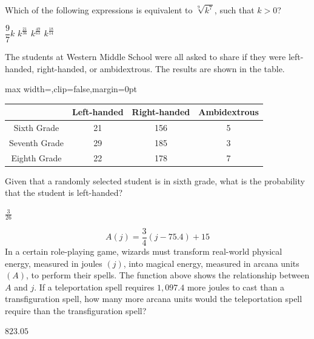 \newpage




\question[1]
Which of the following expressions is equivalent to $\sqrt[9]{k^7}$, such that $k>0$?
\begin{choices}
  \choice $\dfrac{9}{7}k$
  \choice $k^{\frac{21}{36}}$
  \CorrectChoice $k^{\frac{49}{63}}$
  \choice $k^{\frac{18}{14}}$
\end{choices}

\question[1]
The students at Western Middle School were all asked to share if they were left-handed, right-handed, or ambidextrous. The results are shown in the table.
\begin{center}
\vspace{0.35em}
\label{tab:sat-drill-15-handedness}
\renewcommand{\arraystretch}{1.3}
\setlength{\tabcolsep}{0.5em}
\begin{adjustbox}{max width=\linewidth,clip=false,margin=0pt}
\begin{tabular}{|c|c|c|c|}
\hline
\rowcolor[HTML]{E0E0E0}
& Left-handed & Right-handed & Ambidextrous \\
\hline Sixth Grade & 21 & 156 & 5 \\
\hline Seventh Grade & 29 & 185 & 3 \\
\hline Eighth Grade & 22 & 178 & 7 \\
\hline
\end{tabular}
\end{adjustbox}
\end{center}
Given that a randomly selected student is in sixth grade, what is the probability that the student is left-handed?
\begin{solution}
$\frac{3}{26}$
\end{solution}






\newpage




\question[1]
\[
A(j)=\frac{3}{4}(j-75.4)+15
\]
In a certain role-playing game, wizards must transform real-world physical energy, measured in joules $(j)$, into magical energy, measured in arcana units $(A)$, to perform their spells. The function above shows the relationship between $A$ and $j$. If a teleportation spell requires $1{,}097.4$ more joules to cast than a transfiguration spell, how many more arcana units would the teleportation spell require than the transfiguration spell?
\begin{solution}
$823.05$
\end{solution}

